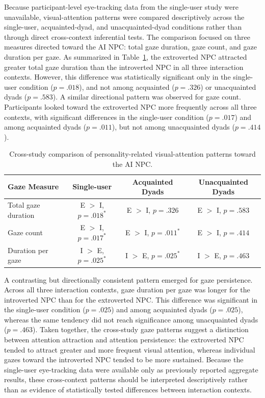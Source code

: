 \documentclass[a4paper,fleqn]{cas-sc}
\begin{document}
Because participant-level eye-tracking data from the single-user study were unavailable, visual-attention patterns were compared descriptively across the single-user, acquainted-dyad, and unacquainted-dyad conditions rather than through direct cross-context inferential tests. The comparison focused on three measures directed toward the AI NPC: total gaze duration, gaze count, and gaze duration per gaze. As summarized in Table~\ref{tab:cross_gaze}, the extroverted NPC attracted greater total gaze duration than the introverted NPC in all three interaction contexts. However, this difference was statistically significant only in the single-user condition ($p=.018$), and not among acquainted ($p=.326$) or unacquainted dyads ($p=.583$). A similar directional pattern was observed for gaze count. Participants looked toward the extroverted NPC more frequently across all three contexts, with significant differences in the single-user condition ($p=.017$) and among acquainted dyads ($p=.011$), but not among unacquainted dyads ($p=.414$).

\begin{table}[t]
\centering
\caption{Cross-study comparison of personality-related visual-attention patterns toward the AI NPC.}
\label{tab:cross_gaze}
\begin{tabular}{lccc}
\toprule
\textbf{Gaze Measure} &
\textbf{Single-user} &
\textbf{Acquainted Dyads} &
\textbf{Unacquainted Dyads} \\
\midrule
Total gaze duration
& E $>$ I, $p=.018^{*}$
& E $>$ I, $p=.326$
& E $>$ I, $p=.583$ \\

Gaze count
& E $>$ I, $p=.017^{*}$
& E $>$ I, $p=.011^{*}$
& E $>$ I, $p=.414$ \\

Duration per gaze
& I $>$ E, $p=.025^{*}$
& I $>$ E, $p=.025^{*}$
& I $>$ E, $p=.463$ \\
\bottomrule
\end{tabular}
\end{table}

A contrasting but directionally consistent pattern emerged for gaze persistence. Across all three interaction contexts, gaze duration per gaze was longer for the introverted NPC than for the extroverted NPC. This difference was significant in the single-user condition ($p=.025$) and among acquainted dyads ($p=.025$), whereas the same tendency did not reach significance among unacquainted dyads ($p=.463$). Taken together, the cross-study gaze patterns suggest a distinction between attention attraction and attention persistence: the extroverted NPC tended to attract greater and more frequent visual attention, whereas individual gazes toward the introverted NPC tended to be more sustained. Because the single-user eye-tracking data were available only as previously reported aggregate results, these cross-context patterns should be interpreted descriptively rather than as evidence of statistically tested differences between interaction contexts.
\end{document}
